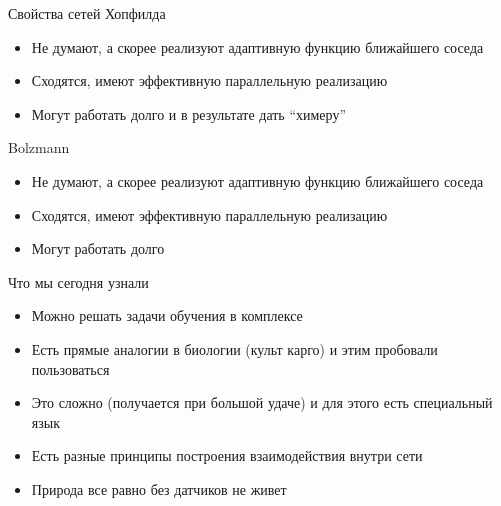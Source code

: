 \documentclass[14pt, fleqn, xcolor={dvipsnames, table}]{beamer}
\begin{document}
\begin{frame}{Свойства сетей Хопфилда}
\begin{itemize}
  \item Не думают, а скорее реализуют адаптивную функцию ближайшего соседа
  \item Сходятся, имеют эффективную параллельную реализацию
  \item Могут работать долго и в результате дать ``химеру''
\end{itemize}
\end{frame}

\begin{frame}{Bolzmann }
\begin{itemize}
  \item Не думают, а скорее реализуют адаптивную функцию ближайшего соседа
  \item Сходятся, имеют эффективную параллельную реализацию
  \item Могут работать долго
\end{itemize}
\end{frame}


\begin{frame}{Что мы сегодня узнали}
\begin{itemize}
  \item Можно решать задачи обучения в комплексе
  \item Есть прямые аналогии в биологии (культ карго) и этим пробовали пользоваться
  \item Это сложно (получается при большой удаче) и для этого есть специальный язык
  \item Есть разные принципы построения взаимодействия внутри сети
  \item Природа все равно без датчиков не живет
\end{itemize}
\end{frame}
\end{document}
